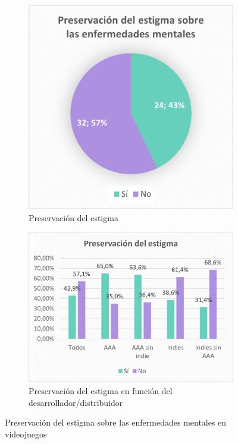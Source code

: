 \documentclass[12pt, a4paper,twoside,titlepage]{book}
\begin{document}
\begin{figure}
\centering
\begin{subfigure}{.4\textwidth}
  \centering
  \includegraphics[width=.95\linewidth]{Graficas estudio/G16;Estigma.png}
  \caption{Preservación del estigma}
\end{subfigure}%
\begin{subfigure}{.6\textwidth}
  \centering
  \includegraphics[width=.95\linewidth]{Graficas estudio/G17; EstigmaVS.png}
  \caption{Preservación del estigma en función del desarrollador/distribuidor}
\end{subfigure}
\caption{Preservación del estigma sobre las enfermedades mentales en videojuegos}
\label{fig:ESTEstigma}
\end{figure}
\end{document}
